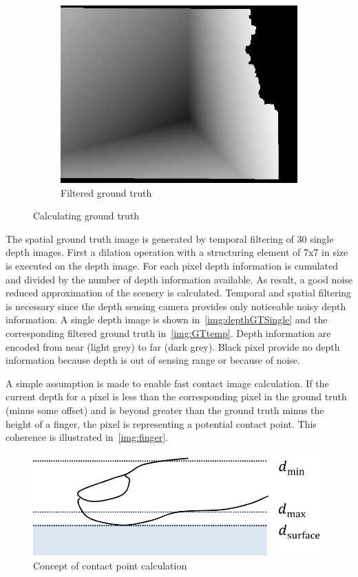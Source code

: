 \begin{figure}[htbp]
         \begin{subfigure}[b]{0.31\textwidth}
                \includegraphics[width=\textwidth]{images/software/gt/GroundTruth.jpg}
                \caption{Filtered ground truth}
                \label{img:GTtemp}
        \end{subfigure}
        \caption{Calculating ground truth}
        \label{img:calcGT}
\end{figure}

The spatial ground truth image is generated by temporal filtering of 30 single depth images. First a dilation operation with a structuring element of 7x7 in size is executed on the depth image. For each pixel depth information is cumulated and divided by the number of depth information available. As result, a good noise reduced approximation of the scenery is calculated. Temporal and spatial filtering is necessary since the depth sensing camera provides only noticeable noisy depth information. A single depth image is shown in~\autoref{img:depthGTSingle} and the corresponding filtered ground truth in~\autoref{img:GTtemp}. Depth information are encoded from near (light grey) to far (dark grey). Black pixel provide no depth information because depth is out of sensing range or because of noise.

A simple assumption is made to enable fast contact image calculation. If the current depth for a pixel is less than the corresponding pixel in the ground truth (minus some offset) and is beyond greater than the ground truth minus the height of a finger, the pixel is representing a potential contact point. This coherence is illustrated in~\autoref{img:finger}. 
\begin{figure}[htbp]
\begin{center}
                \includegraphics[width=.6\textwidth]{images/software/finger.png}
\caption{Concept of contact point calculation \cite{Wilson:2010bv}}
\label{img:finger}
\end{center}
\end{figure}

